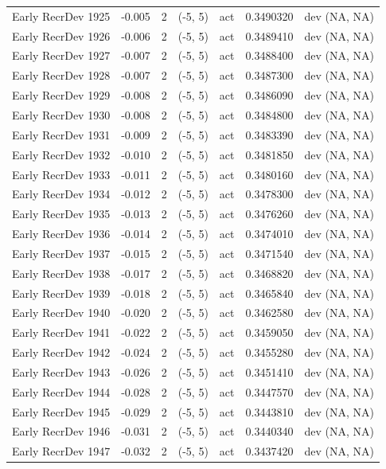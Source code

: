 \documentclass[11pt,
  english,
  a4paper,
]{article}
\begin{document}
\begin{landscape}
\begin{longtable}[t]{>{\raggedright\arraybackslash}p{7cm}lllll>{\raggedright\arraybackslash}p{4cm}}
Early RecrDev 1925 & -0.005 & 2 & (-5, 5) & act & 0.3490320 & dev (NA, NA)\\
Early RecrDev 1926 & -0.006 & 2 & (-5, 5) & act & 0.3489410 & dev (NA, NA)\\
Early RecrDev 1927 & -0.007 & 2 & (-5, 5) & act & 0.3488400 & dev (NA, NA)\\
Early RecrDev 1928 & -0.007 & 2 & (-5, 5) & act & 0.3487300 & dev (NA, NA)\\
Early RecrDev 1929 & -0.008 & 2 & (-5, 5) & act & 0.3486090 & dev (NA, NA)\\
Early RecrDev 1930 & -0.008 & 2 & (-5, 5) & act & 0.3484800 & dev (NA, NA)\\
Early RecrDev 1931 & -0.009 & 2 & (-5, 5) & act & 0.3483390 & dev (NA, NA)\\
Early RecrDev 1932 & -0.010 & 2 & (-5, 5) & act & 0.3481850 & dev (NA, NA)\\
Early RecrDev 1933 & -0.011 & 2 & (-5, 5) & act & 0.3480160 & dev (NA, NA)\\
Early RecrDev 1934 & -0.012 & 2 & (-5, 5) & act & 0.3478300 & dev (NA, NA)\\
Early RecrDev 1935 & -0.013 & 2 & (-5, 5) & act & 0.3476260 & dev (NA, NA)\\
Early RecrDev 1936 & -0.014 & 2 & (-5, 5) & act & 0.3474010 & dev (NA, NA)\\
Early RecrDev 1937 & -0.015 & 2 & (-5, 5) & act & 0.3471540 & dev (NA, NA)\\
Early RecrDev 1938 & -0.017 & 2 & (-5, 5) & act & 0.3468820 & dev (NA, NA)\\
Early RecrDev 1939 & -0.018 & 2 & (-5, 5) & act & 0.3465840 & dev (NA, NA)\\
Early RecrDev 1940 & -0.020 & 2 & (-5, 5) & act & 0.3462580 & dev (NA, NA)\\
Early RecrDev 1941 & -0.022 & 2 & (-5, 5) & act & 0.3459050 & dev (NA, NA)\\
Early RecrDev 1942 & -0.024 & 2 & (-5, 5) & act & 0.3455280 & dev (NA, NA)\\
Early RecrDev 1943 & -0.026 & 2 & (-5, 5) & act & 0.3451410 & dev (NA, NA)\\
Early RecrDev 1944 & -0.028 & 2 & (-5, 5) & act & 0.3447570 & dev (NA, NA)\\
Early RecrDev 1945 & -0.029 & 2 & (-5, 5) & act & 0.3443810 & dev (NA, NA)\\
Early RecrDev 1946 & -0.031 & 2 & (-5, 5) & act & 0.3440340 & dev (NA, NA)\\
Early RecrDev 1947 & -0.032 & 2 & (-5, 5) & act & 0.3437420 & dev (NA, NA)\\

\end{longtable}
\end{landscape}
\end{document}
